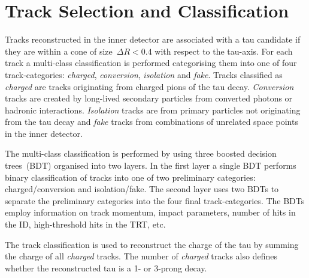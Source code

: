 \section{Track Selection and Classification}
\label{sec:reco_track_sel_classif}
%
Tracks reconstructed in the inner detector are associated with a tau candidate
if they are within a cone of size~$\Delta R < 0.4$ with respect to the tau-axis.
%
%
%
For each track a multi-class classification is performed categorising them into
one of four track-categories: \emph{charged}, \emph{conversion},
\emph{isolation} and \emph{fake}. Tracks classified as \emph{charged} are tracks
originating from charged pions of the tau decay. \emph{Conversion} tracks are
created by long-lived secondary particles from converted photons or hadronic
interactions. \emph{Isolation} tracks are from primary particles not originating
from the tau decay and \emph{fake} tracks from combinations of unrelated space
points in the inner detector.

The multi-class classification is performed by using three boosted decision
trees~(BDT) organised into two layers. In the first layer a single BDT performs
binary classification of tracks into one of two preliminary categories:
charged/conversion and isolation/fake. The second layer uses two BDTs to
separate the preliminary categories into the four final track-categories. The
BDTs employ information on track momentum, impact parameters, number of hits in
the ID, high-threshold hits in the TRT, etc.

The track classification is used to reconstruct the charge of the tau by summing
the charge of all \emph{charged} tracks. The number of \emph{charged} tracks
also defines whether the reconstructed tau is a 1- or 3-prong decay.

